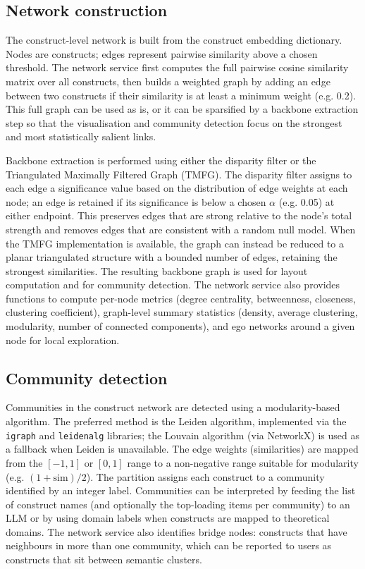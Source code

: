 \documentclass[11pt]{article}
\begin{document}
\subsection{Network construction}

The construct-level network is built from the construct embedding dictionary. Nodes are constructs; edges represent pairwise similarity above a chosen threshold. The network service first computes the full pairwise cosine similarity matrix over all constructs, then builds a weighted graph by adding an edge between two constructs if their similarity is at least a minimum weight (e.g. 0.2). This full graph can be used as is, or it can be sparsified by a backbone extraction step so that the visualisation and community detection focus on the strongest and most statistically salient links.

Backbone extraction is performed using either the disparity filter or the Triangulated Maximally Filtered Graph (TMFG). The disparity filter assigns to each edge a significance value based on the distribution of edge weights at each node; an edge is retained if its significance is below a chosen $\alpha$ (e.g. 0.05) at either endpoint. This preserves edges that are strong relative to the node's total strength and removes edges that are consistent with a random null model. When the TMFG implementation is available, the graph can instead be reduced to a planar triangulated structure with a bounded number of edges, retaining the strongest similarities. The resulting backbone graph is used for layout computation and for community detection. The network service also provides functions to compute per-node metrics (degree centrality, betweenness, closeness, clustering coefficient), graph-level summary statistics (density, average clustering, modularity, number of connected components), and ego networks around a given node for local exploration.

\subsection{Community detection}

Communities in the construct network are detected using a modularity-based algorithm. The preferred method is the Leiden algorithm, implemented via the \texttt{igraph} and \texttt{leidenalg} libraries; the Louvain algorithm (via NetworkX) is used as a fallback when Leiden is unavailable. The edge weights (similarities) are mapped from the $[-1,1]$ or $[0,1]$ range to a non-negative range suitable for modularity (e.g. $(1+\text{sim})/2$). The partition assigns each construct to a community identified by an integer label. Communities can be interpreted by feeding the list of construct names (and optionally the top-loading items per community) to an LLM or by using domain labels when constructs are mapped to theoretical domains. The network service also identifies bridge nodes: constructs that have neighbours in more than one community, which can be reported to users as constructs that sit between semantic clusters.
\end{document}
